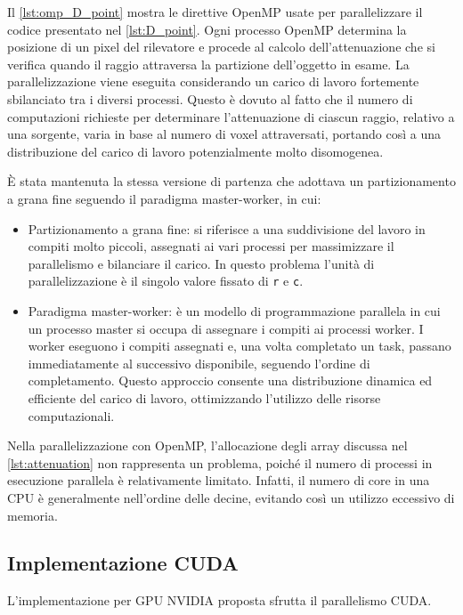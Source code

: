 \documentclass[12pt,a4paper]{report}
\begin{document}
Il \autoref{lst:omp_D_point} mostra le direttive OpenMP usate per parallelizzare il codice presentato nel \autoref{lst:D_point}.
Ogni processo OpenMP determina la posizione di un pixel del rilevatore e procede al calcolo dell'attenuazione che si verifica
quando il raggio attraversa la partizione dell'oggetto in esame.
La parallelizzazione viene eseguita considerando un carico di lavoro fortemente sbilanciato tra i diversi processi.
Questo è dovuto al fatto che il numero di computazioni richieste per determinare l'attenuazione di ciascun raggio, relativo a una
sorgente, varia in base al numero di voxel attraversati, portando così a una distribuzione del carico di lavoro potenzialmente
molto disomogenea.

È stata mantenuta la stessa versione di partenza che adottava un partizionamento a grana fine seguendo il paradigma master-worker,
in cui:
\begin{itemize}
  \item Partizionamento a grana fine: si riferisce a una suddivisione del lavoro in compiti molto piccoli, assegnati ai vari
        processi per massimizzare il parallelismo e bilanciare il carico.
        In questo problema l'unità di parallelizzazione è il singolo valore fissato di \lstinline{r} e \mbox{\lstinline{c}.}
  \item Paradigma master-worker: è un modello di programmazione parallela in cui un processo master si occupa di assegnare i
        compiti ai processi worker.
        I worker eseguono i compiti assegnati e, una volta completato un task, passano immediatamente al successivo disponibile,
        seguendo l'ordine di completamento.
        Questo approccio consente una distribuzione dinamica ed efficiente del carico di lavoro, ottimizzando l'utilizzo delle
        risorse computazionali.
\end{itemize}

Nella parallelizzazione con OpenMP, l'allocazione degli array discussa nel \autoref{lst:attenuation} non rappresenta un problema,
poiché il numero di processi in esecuzione parallela è relativamente limitato.
Infatti, il numero di core in una CPU è generalmente nell'ordine delle decine, evitando così un utilizzo eccessivo di memoria.

\subsection{Implementazione CUDA}

L'implementazione per GPU NVIDIA proposta sfrutta il parallelismo CUDA.
\end{document}
